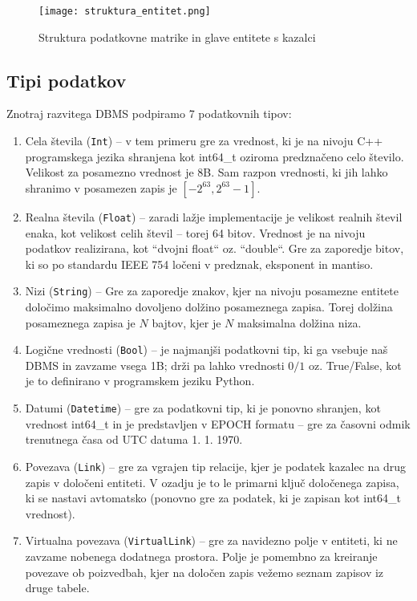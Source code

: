 \documentclass[a4paper,12pt,openright]{book}
\begin{document}
        \begin{figure}[h]
            \centerline{\texttt{[image: struktura\_entitet.png]}}
            \caption{Struktura podatkovne matrike in glave entitete s kazalci}
            \label{sl:mindmap}
        \end{figure}
        
        \subsection{Tipi podatkov}
        Znotraj razvitega DBMS podpiramo 7 podatkovnih tipov:
        \begin{enumerate}
            \item Cela števila ({\tt Int}) – v tem primeru gre za vrednost, ki je na nivoju C++ programskega jezika shranjena kot int64\_t oziroma predznačeno celo število. Velikost za posamezno vrednost je 8B. Sam razpon vrednosti, ki jih lahko shranimo v posamezen zapis je $[-2^{63}, 2^{63} - 1]$.
            \item Realna števila ({\tt Float}) – zaradi lažje implementacije je velikost realnih števil enaka, kot velikost celih števil – torej 64 bitov. Vrednost je na nivoju podatkov realizirana, kot ``dvojni float`` oz. ``double``. Gre za zaporedje bitov, ki so po standardu IEEE 754 \cite{kahan1996ieee} ločeni v predznak, eksponent in mantiso.
            \item Nizi ({\tt String}) – Gre za zaporedje znakov, kjer na nivoju posamezne entitete določimo maksimalno dovoljeno dolžino posameznega zapisa. Torej dolžina posameznega zapisa je $N$ bajtov, kjer je $N$ maksimalna dolžina niza. 
            \item Logične vrednosti ({\tt Bool}) – je najmanjši podatkovni tip, ki ga vsebuje naš DBMS in zavzame vsega 1B; drži pa lahko vrednosti $0/1$ oz. True/False, kot je to definirano v programskem jeziku Python.
            \item Datumi ({\tt Datetime}) – gre za podatkovni tip, ki je ponovno shranjen, kot vrednost int64\_t in je predstavljen v EPOCH formatu \cite{EPOCH_FORMAT} – gre za časovni odmik trenutnega časa od UTC datuma 1. 1. 1970. 
            \item Povezava ({\tt Link}) – gre za vgrajen tip relacije, kjer je podatek kazalec na drug zapis v določeni entiteti. V ozadju je to le primarni ključ določenega zapisa, ki se nastavi avtomatsko (ponovno gre za podatek, ki je zapisan kot int64\_t vrednost).
            \item Virtualna povezava ({\tt VirtualLink}) – gre za navidezno polje v entiteti, ki ne zavzame nobenega dodatnega prostora. Polje je pomembno za kreiranje povezave ob poizvedbah, kjer na določen zapis vežemo seznam zapisov iz druge tabele.  
        \end{enumerate}
        
\end{document}
